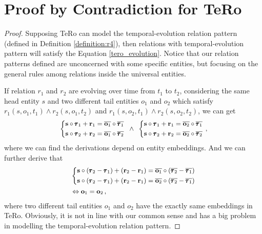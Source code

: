 \documentclass[11pt]{article}
\newcommand{\vect}[1]{\mathbf{#1}\xspace}
\newcommand{\vects}{\vect{s}\xspace}
\begin{document}
\section{Proof by Contradiction for TeRo}
\label{app:proof_tero}
\begin{proof}
Supposing TeRo \cite{xu2020tero} can model the temporal-evolution relation pattern (defined in Definition \ref{definition:r4}), then relations with temporal-evolution pattern will satisfy the Equation \ref{tero_evolution}.
Notice that our relation patterns defined are unconcerned with some specific entities, but focusing on the general rules among relations inside the universal entities.

If relation $r_1$ and $r_2$ are evolving over time from $t_1$ to $t_2$, considering the same head entity $s$ and two different tail entities $o_1$ and $o_2$ which satisfy $ r_1(s,o_1,t_1) \land r_2(s,o_1,t_2)$ and $ r_1(s,o_2,t_1) \land r_2(s,o_2,t_2)$, we can get
\begin{equation}\small
\begin{aligned}
&\left\{  
     \begin{aligned}
     &\vects \circ \pmb{\tau}_1 + \vect{r}_1 = \overline{\vect{o}_1} \circ \overline{\pmb{\tau}_1}
     \\
    &\vects \circ \pmb{\tau}_2 + \vect{r}_2 = \overline{\vect{o}_1} \circ \overline{\pmb{\tau}_2}
    \end{aligned}
\right.
\hspace{0.5em}
\land
\hspace{0.5em}
\left\{  
     \begin{aligned}
     &\vects \circ \pmb{\tau}_1 + \vect{r}_1 = \overline{\vect{o}_2} \circ \overline{\pmb{\tau}_1}
     \\
    &\vects \circ \pmb{\tau}_2 + \vect{r}_2 = \overline{\vect{o}_2} \circ \overline{\pmb{\tau}_2}
    \end{aligned}
\right. \,, \\
\end{aligned}
\end{equation}
where we can find the derivations depend on entity embeddings. And we can further derive that
\begin{equation}\small
\begin{aligned}
&\left\{  
     \begin{aligned}
     &\vects \circ (\pmb{\tau}_2 - \pmb{\tau}_1) + (\vect{r}_2 - \vect{r}_1) = \overline{\vect{o}_1} \circ (\overline{\pmb{\tau}_2} - \overline{\pmb{\tau}_1})
     \\
     &\vects \circ (\pmb{\tau}_2 - \pmb{\tau}_1) + (\vect{r}_2 - \vect{r}_1) = \overline{\vect{o}_2} \circ (\overline{\pmb{\tau}_2} - \overline{\pmb{\tau}_1})
    \end{aligned}
\right. \\
& \Leftrightarrow
\vect{o}_1 =  \vect{o}_2 \,,
\end{aligned}
\end{equation}
where two different tail entities $o_1$ and $o_2$ have the exactly same embeddings in TeRo. Obviously, it is not in line with our common sense and has a big problem in modelling the temporal-evolution relation pattern.
\end{proof}
\end{document}
